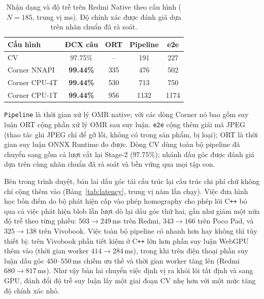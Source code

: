 \documentclass[conference]{IEEEtran}
\begin{document}
\begin{table}[!htb]
\caption{Nhận dạng và độ trễ trên Redmi Native theo cấu hình ($N{=}185$, trung vị
ms). Độ chính xác được đánh giá dựa trên nhãn chuẩn đã rà soát.}
\label{tab:stage-mini}
\centering
\setlength{\tabcolsep}{6pt}
\footnotesize
\begin{tabular}{lcccc}
\toprule
\textbf{Cấu hình} & \textbf{ĐCX câu} & \textbf{ORT} & \textbf{Pipeline} & \textbf{e2e} \\
\midrule
CV              & 97.75\%         & --  & 191  & 227  \\
Corner NNAPI    & \textbf{99.44\%} & 335 & 476  & 502  \\
Corner CPU-4T   & \textbf{99.44\%} & 530 & 713  & 750  \\
Corner CPU-1T   & \textbf{99.44\%} & 956 & 1132 & 1174 \\
\bottomrule
\end{tabular}

\vspace{2pt}
\parbox{\columnwidth}{\footnotesize
\texttt{Pipeline} là thời gian xử lý OMR native; với các dòng Corner nó bao gồm
suy luận ORT cộng phần xử lý OMR sau suy luận. \texttt{e2e} cộng thêm giải mã JPEG
(thao tác ghi JPEG chỉ để gỡ lỗi, không có trong sản phẩm, bị loại); ORT là thời
gian suy luận ONNX Runtime đo được. Dòng CV dùng toàn bộ pipeline đã chuyển sang
gồm cả lượt cắt lại Stage-2 ($97.75\%$); nhánh dấu góc được đánh giá dựa trên cùng
nhãn chuẩn đã rà soát và bền vững qua mọi tập con.}
\end{table}

Bên trong trình duyệt, bản lai dấu góc tái cấu trúc lại cấu trúc chi phí chứ không
chỉ cộng thêm vào (Bảng~\ref{tab:latency}, trung vị năm lần chạy). Việc đưa hình
học bốn điểm do bộ phát hiện cấp vào phép homography cho phép lõi C\texttt{++} bỏ
qua cả việc phát hiện blob lẫn lượt dò lại dấu góc thứ hai, gần như giảm một nửa
độ trễ theo từng phiếu: $503\to249$\,ms trên Redmi, $343\to166$ trên Poco Pad, và
$325\to138$ trên Vivobook. Việc toàn bộ pipeline có nhanh hơn hay không thì tùy
thiết bị: trên Vivobook phần tiết kiệm ở C\texttt{++} lớn hơn phần suy luận WebGPU
thêm vào (thời gian worker $414\to284$\,ms), trong khi trên điện thoại phần suy
luận dấu góc $450$--$550$\,ms chiếm ưu thế và thời gian worker tăng lên (Redmi
$680\to817$\,ms). Như vậy bản lai chuyển việc định vị ra khỏi lõi tất định và sang
GPU, đánh đổi độ trễ suy luận lấy một giai đoạn CV nhẹ hơn với một mức tăng độ
chính xác nhỏ.
\end{document}

